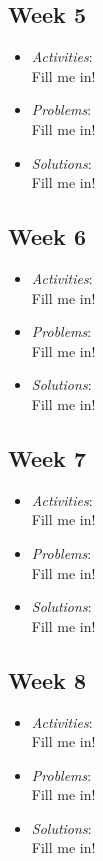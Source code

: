 \documentclass[compsoc,draftclsnofoot,onecolumn,10pt]{IEEEtran}
\begin{document}
\subsection{Week 5}
	\begin{itemize}
        \item \textit{Activities}:\\
        Fill me in!
        \item \textit{Problems}:\\
        Fill me in!
        \item \textit{Solutions}:\\
        Fill me in!
	\end{itemize}
   
\subsection{Week 6}
	\begin{itemize}
        \item \textit{Activities}:\\
        Fill me in!
        \item \textit{Problems}:\\
        Fill me in!
        \item \textit{Solutions}:\\
        Fill me in!
	\end{itemize}
   
\subsection{Week 7}
	\begin{itemize}
        \item \textit{Activities}:\\
        Fill me in!
        \item \textit{Problems}:\\
        Fill me in!
        \item \textit{Solutions}:\\
        Fill me in!
	\end{itemize}
   
\subsection{Week 8}
	\begin{itemize}
        \item \textit{Activities}:\\
        Fill me in!
        \item \textit{Problems}:\\
        Fill me in!
        \item \textit{Solutions}:\\
        Fill me in!
	\end{itemize}
   
\end{document}
